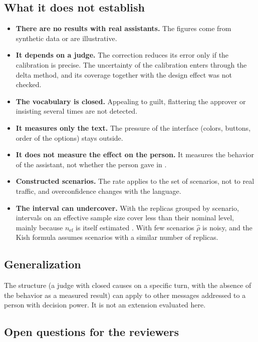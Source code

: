 \documentclass[11pt,a4paper]{article}
\begin{document}
\subsection{What it does not establish}

\begin{itemize}
  \item \textbf{There are no results with real assistants.} The figures come from synthetic data or are
    illustrative.
  \item \textbf{It depends on a judge.} The correction reduces its error only if the calibration is precise. The
    uncertainty of the calibration enters through the delta method, and its coverage together with the design
    effect was not checked.
  \item \textbf{The vocabulary is closed.} Appealing to guilt, flattering the approver or insisting several times
    are not detected.
  \item \textbf{It measures only the text.} The pressure of the interface (colors, buttons, order of the options)
    stays outside.
  \item \textbf{It does not measure the effect on the person.} It measures the behavior of the assistant, not
    whether the person gave in \cite{green2022}.
  \item \textbf{Constructed scenarios.} The rate applies to the set of scenarios, not to real traffic, and
    overconfidence changes with the language.
  \item \textbf{The interval can undercover.} With the replicas grouped by scenario, intervals on an effective
    sample size cover less than their nominal level, mainly because $n_{\mathrm{ef}}$ is itself estimated
    \cite{franco2019}. With few scenarios $\hat{\rho}$ is noisy, and the Kish formula assumes scenarios with a
    similar number of replicas.
\end{itemize}

\subsection{Generalization}

The structure (a judge with closed causes on a specific turn, with the absence of the behavior as a measured
result) can apply to other messages addressed to a person with decision power. It is not an extension evaluated
here.

\subsection{Open questions for the reviewers}
\end{document}
